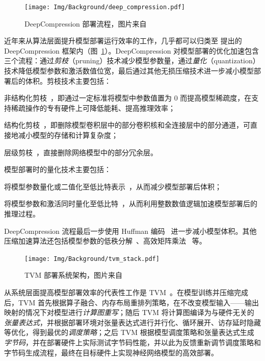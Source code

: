 \begin{figure}[htb]
  \centering
  \texttt{[image: Img/Background/deep\_compression.pdf]}
  \caption{DeepCompression 部署流程，图片来自~\citet{han2015deep}}
  \label{img::background::deep_compression}
\end{figure}

近年来从算法层面提升模型部署运行效率的工作，几乎都可以归类至 \citet{han2015deep, han2017efficient} 提出的 DeepCompression 框架内（图~\ref{img::background::deep_compression}）。DeepCompression 对模型部署的优化加速包含三个流程：通过\emph{剪枝}（pruning）技术减少模型参数量，通过\emph{量化}（quantization）技术降低模型参数和激活数值位宽，最后通过其他无损压缩技术进一步减小模型部署后的体积。剪枝技术主要包括：
{
  \setlist[enumerate]{}
  \begin{enumerate*}[1)]
    \item 非结构化剪枝~\citep{han2015learning}，即通过一定标准将模型中参数值置为 $0$ 而提高模型稀疏度，在支持稀疏操作的专有硬件上可降低能耗、提高推理效率；
    \item 结构化剪枝~\citep{li2016pruning}，即删除模型卷积层中的部分卷积核和全连接层中的部分通道，可直接地减小模型的存储和计算复杂度；
    \item 层级剪枝~\citep{chen2018shallowing}，直接删除网络模型中的部分冗余层。
  \end{enumerate*}
}
模型部署时的量化技术主要包括：
{
  \setlist[enumerate]{}
  \begin{enumerate*}[1)]
    \item 将模型参数量化或二值化至低比特表示~\citep{courbariaux2015binaryconnect, hou2018loss}，从而减少模型部署后体积；
    \item 将模型参数和激活同时量化至低比特~\citep{rastegari2016xnor, jacob2018quantization}，从而利用整数数值逻辑加速模型部署后的推理过程。
  \end{enumerate*}
}
DeepCompression 流程最后一步使用 Huffman 编码~\citep{van1976construction} 进一步减小模型体积。其他压缩加速算法还包括模型参数的低秩分解~\citep{sainath2013low}、高效矩阵乘法~\citep{lavin2016fast} 等。

\begin{figure}[htb]
  \centering
  \texttt{[image: Img/Background/tvm\_stack.pdf]}
  \caption{TVM 部署系统架构，图片来自~\citet{chen2018tvm}}
  \label{img::background::tvm}
\end{figure}

从系统层面提高模型部署效率的代表性工作是 TVM~\citep{chen2018tvm}。在模型训练并压缩完成后，TVM 首先根据算子融合、内存布局重排列策略，在不改变模型输入——输出映射的情况下对模型进行\emph{计算图重写}；随后 TVM 将计算图编译为与硬件无关的\emph{张量表达式}，并根据部署环境对张量表达式进行并行化、循环展开、访存延时隐藏等优化，得到最优的\emph{调度策略}；之后 TVM 根据模型调度策略和张量表达式生成\emph{字节码}，并在部署硬件上实际测试字节码性能，并以此为反馈重新调节调度策略和字节码生成流程，最终在目标硬件上实现神经网络模型的高效部署。
